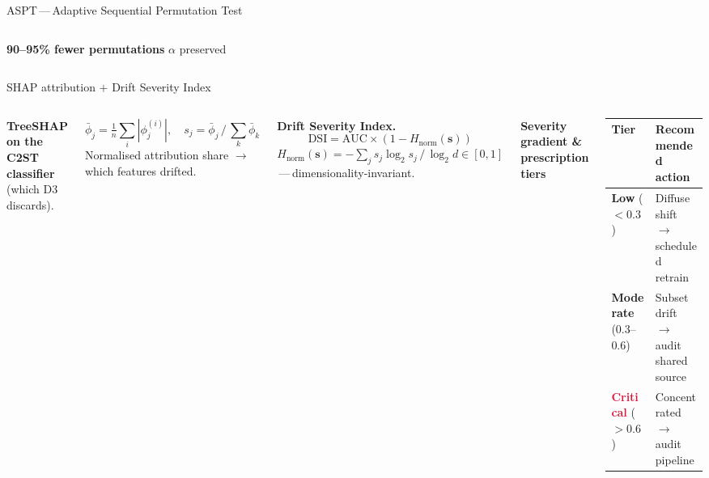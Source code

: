 \documentclass[aspectratio=169,10pt,t,xcolor={table}]{beamer}
\newcommand{\eaddsec}{}
\newcommand{\setsec}[1]{\renewcommand{\eaddsec}{#1}}
\begin{document}
\begin{frame}{ASPT\,---\,Adaptive Sequential Permutation Test}
\begin{columns}[T,onlytextwidth]
\vspace{0.2em}
\colorbox{cobalt!16}{\small\textbf{\color{ink}90--95\% fewer permutations}
\textbar{} $\alpha$ preserved}
\end{columns}
\end{frame}

\setsec{02 \textbar{} CONTRIBUTION 2}
\begin{frame}{SHAP attribution $+$ Drift Severity Index}
\begin{columns}[T,onlytextwidth]
\textbf{TreeSHAP on the C2ST classifier} (which D3 discards).

\smallskip
\[
\bar\phi_j = \tfrac{1}{n}\sum_i |\phi_j^{(i)}|, \quad
s_j = \bar\phi_j \,/\, \textstyle\sum_k \bar\phi_k
\]
{\scriptsize\color{graphite}Normalised attribution share $\to$ which features drifted.}

\smallskip
\textbf{Drift Severity Index.}
\[
\boxed{\;\mathrm{DSI}=\mathrm{AUC}\times(1-H_{\mathrm{norm}}(\mathbf{s}))\;}
\]
{\scriptsize $H_{\mathrm{norm}}(\mathbf{s})=-\sum_j s_j\log_2 s_j\,/\,\log_2 d \in[0,1]$\,---\,dimensionality-invariant.}

\centering\textbf{\small Severity gradient \& prescription tiers}

\vspace{0.3em}

\vspace{1.2em}
{\footnotesize
\begin{tabular}{@{}l p{4.6cm}@{}}
\toprule
\textbf{Tier} & \textbf{Recommended action} \\
\midrule
\textcolor{emerald}{\textbf{Low}} ($<\!0.3$)        & Diffuse shift $\to$ scheduled retrain \\
\textcolor{gold!70!black}{\textbf{Moderate}} (0.3--0.6) & Subset drift $\to$ audit shared source \\
\textcolor{crimson}{\textbf{Critical}} ($>\!0.6$)           & Concentrated $\to$ audit pipeline \\
\bottomrule
\end{tabular}}


\end{columns}
\end{frame}
\end{document}
